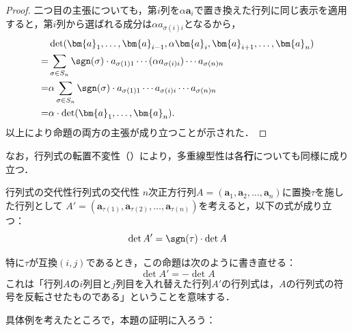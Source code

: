 \begin{leftbar}
\begin{proof}
  二つ目の主張についても，第$i$列を$\alpha\bm{a}_i$で置き換えた行列に同じ表示を適用すると，第$i$列から選ばれる成分は$\alpha a_{\sigma(i)i}$となるから，
  \begin{align*} 
    &\det(\bm{a}_1, \dots, \bm{a}_{i-1}, \alpha \bm{a}_i, \bm{a}_{i+1}, \dots, \bm{a}_n) \\
    =& \sum_{\sigma \in S_n} \sgn(\sigma) \cdot a_{\sigma(1)1} \dotsm (\alpha a_{\sigma(i)i}) \dotsm a_{\sigma(n)n} \\
    =& \alpha \sum_{\sigma \in S_n} \sgn(\sigma) \cdot a_{\sigma(1)1} \dotsm a_{\sigma(i)i} \dotsm a_{\sigma(n)n} \\
    =& \alpha \cdot \det(\bm{a}_1, \dots, \bm{a}_n).
  \end{align*}
  以上により命題の両方の主張が成り立つことが示された．
\end{proof}
\end{leftbar}

なお，行列式の転置不変性（）により，多重線型性は各\textbf{行}についても同様に成り立つ．

\begin{prop}{行列式の交代性}{行列式の交代性}
  $n$次正方行列$A = (\bm{a}_1, \bm{a}_2, \dots, \bm{a}_n)$に置換$\tau$を施した行列として
  $A' = (\bm{a}_{\tau(1)}, \bm{a}_{\tau(2)}, \dots, \bm{a}_{\tau(n)})$を考えると，以下の式が成り立つ：
  \[
  \det A ' = \sgn (\tau) \cdot \det A
  \]
\end{prop}
特に$\tau$が互換$(i,j)$であるとき，この命題は次のように書き直せる：
\[
\det A'  = -\det A
\]
これは「行列$A$の$i$列目と$j$列目を入れ替えた行列$A'$の行列式は，$A$の行列式の符号を反転させたものである」ということを意味する．

具体例を考えたところで，本題の証明に入ろう：

